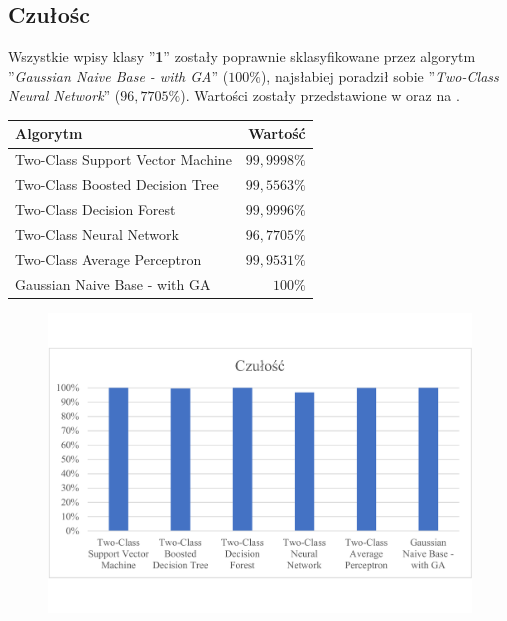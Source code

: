 \subsection{Czułośc}
Wszystkie wpisy klasy ''\textbf{1}'' zostały poprawnie sklasyfikowane przez algorytm ''\textit{Gaussian Naive Base - with GA}'' ($100\%$), najsłabiej poradził sobie ''\textit{Two-Class Neural Network}'' ($96,7705\%$). Wartości zostały przedstawione w  oraz na .

\begin{table}[H]
    \centering
    \begin{tabular}{|l|r|} \hline
    \textbf{Algorytm} & \textbf{Wartość} \\ \hline
    Two-Class Support Vector Machine & $99,9998\%$ \\ \hline
    Two-Class Boosted Decision Tree & $99,5563\%$ \\ \hline
    Two-Class Decision Forest & $99,9996\%$ \\ \hline
    Two-Class Neural Network & $96,7705\%$ \\ \hline
    Two-Class Average Perceptron & $99,9531\%$ \\ \hline
    Gaussian Naive Base - with GA & $100\%$ \\ \hline
    \end{tabular}
    \label{tab:acc-rec}
\end{table}

\begin{figure}[H]
    \centering
    \includegraphics[width=\textwidth]{images/rec-res}
    \label{fig:rec-res}
\end{figure}

